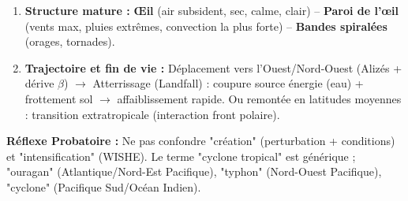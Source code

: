 \documentclass[11pt]{article}
\begin{document}
\begin{methode}
\begin{enumerate}
\begin{itemize}
              \end{itemize}
        \item \textbf{Structure mature :} \textbf{Œil} (air subsident, sec, calme, clair) -- \textbf{Paroi de l'œil} (vents max, pluies extrêmes, convection la plus forte) -- \textbf{Bandes spiralées} (orages, tornades).
        \item \textbf{Trajectoire et fin de vie :} Déplacement vers l'Ouest/Nord-Ouest (Alizés + dérive $\beta$) $\rightarrow$ Atterrissage (Landfall) : coupure source énergie (eau) + frottement sol $\rightarrow$ affaiblissement rapide. Ou remontée en latitudes moyennes : transition extratropicale (interaction front polaire).
    \end{enumerate}
    \textbf{Réflexe Probatoire :} Ne pas confondre "création" (perturbation + conditions) et "intensification" (WISHE). Le terme "cyclone tropical" est générique ; "ouragan" (Atlantique/Nord-Est Pacifique), "typhon" (Nord-Ouest Pacifique), "cyclone" (Pacifique Sud/Océan Indien).
\end{methode}
\end{document}
